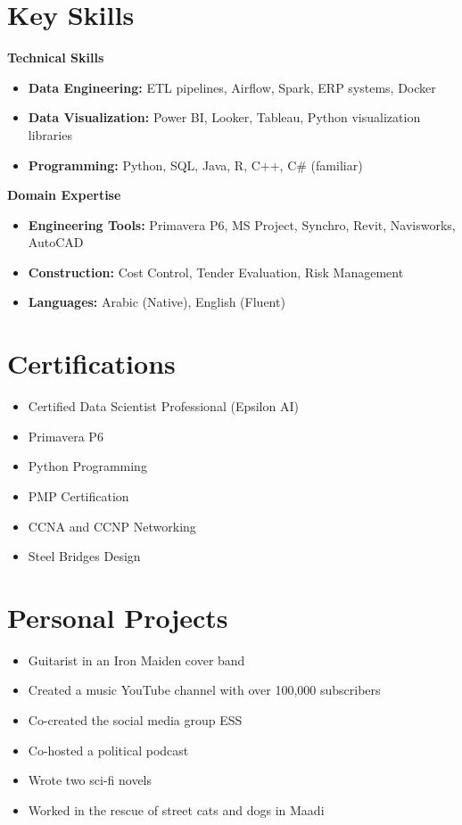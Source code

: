 \documentclass[10pt, letterpaper]{article}
\begin{document}
{\begin{minipage}{\dimexpr\textwidth-2\fboxsep-2\fboxrule\relax}
\section{Key Skills}
\textbf{\textcolor{primaryColor}{Technical Skills}}
\begin{itemize}[leftmargin=*]
    \item \textbf{Data Engineering:} ETL pipelines, Airflow, Spark, ERP systems, Docker
    \item \textbf{Data Visualization:} Power BI, Looker, Tableau, Python visualization libraries
    \item \textbf{Programming:} Python, SQL, Java, R, C++, C\# (familiar)
\end{itemize}

\textbf{\textcolor{primaryColor}{Domain Expertise}}
\begin{itemize}[leftmargin=*]
    \item \textbf{Engineering Tools:} Primavera P6, MS Project, Synchro, Revit, Navisworks, AutoCAD
    \item \textbf{Construction:} Cost Control, Tender Evaluation, Risk Management
    \item \textbf{Languages:} Arabic (Native), English (Fluent)
\end{itemize}

\section{Certifications}
\begin{itemize}[leftmargin=*]
    \item Certified Data Scientist Professional (Epsilon AI)
    \item Primavera P6
    \item Python Programming
    \item PMP Certification
    \item CCNA and CCNP Networking
    \item Steel Bridges Design
\end{itemize}

\section{Personal Projects}
\begin{itemize}[leftmargin=*]
    \item Guitarist in an Iron Maiden cover band
    \item Created a music YouTube channel with over 100,000 subscribers
    \item Co-created the social media group ESS
    \item Co-hosted a political podcast
    \item Wrote two sci-fi novels
    \item Worked in the rescue of street cats and dogs in Maadi
\end{itemize}
\end{minipage}}
\end{document}
